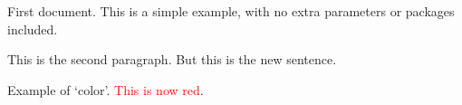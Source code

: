 \documentclass[10pt, a5paper]{article}
\begin{document}
First document.
This is a simple example,
with no extra parameters or packages included.

This is the second paragraph.
But this is the new sentence.

Example of `color'.
\textcolor{red}{This is now red}.
\end{document}
